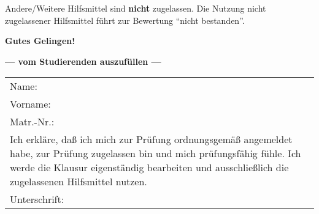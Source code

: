 \begin{coverpages}
\begin{minipage}[c]{0.5\textwidth}
\begin{minipage}[c]{0.96\textwidth}
\begin{itemize}
                \smallskip
                Andere/Weitere Hilfsmittel sind \textbf{nicht} zugelassen. Die
                Nutzung nicht zugelassener Hilfsmittel führt zur Bewertung
                \enquote{nicht bestanden}.
            \end{itemize}
            \bigskip
            \medskip
            \textbf{Gutes Gelingen!}
            \smallskip
            \vspace{2mm}
        \end{minipage}
    \end{minipage}
    \vrule
    \begin{minipage}[c]{0.5\textwidth}
        \bigskip
        \begin{center}
            \textcolor{headcolor}
            {\textbf{--- vom Studierenden auszufüllen ---}} \\[6mm]
        \end{center}
        \begin{center}
            \renewcommand{\arraystretch}{1.5}
            \begin{tabular}{@{\bfseries}lp{5cm}}
                Name:     & \dotfill \\[1mm]
                Vorname:  & \dotfill \\[1mm]
                Matr.-Nr.:& \dotfill \\[6mm]

                \multicolumn{2}{l}{\begin{minipage}[c]{76mm}
                                       Ich erkläre, daß ich mich zur Prüfung ordnungsgemäß angemeldet habe,
                                       zur Prüfung zugelassen bin und mich prüfungsfähig fühle.
                                       Ich werde die Klausur eigenständig bearbeiten und aus\-schließlich die
                                       zugelassenen Hilfsmittel nutzen.
                \end{minipage}
                }\\[22mm]

                Unterschrift:& \dotfill
            \end{tabular}
        \end{center}
        \smallskip
    \end{minipage}
    \par\hrulefill\par
    \vspace{10mm}


\end{coverpages}
